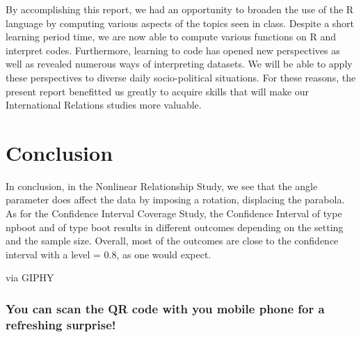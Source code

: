\documentclass[11pt,]{article}
\begin{document}
By accomplishing this report, we had an opportunity to broaden the use
of the R language by computing various aspects of the topics seen in
class. Despite a short learning period time, we are now able to compute
various functions on R and interpret codes. Furthermore, learning to
code has opened new perspectives as well as revealed numerous ways of
interpreting datasets. We will be able to apply these perspectives to
diverse daily socio-political situations. For these reasons, the present
report benefitted us greatly to acquire skills that will make our
International Relations studies more valuable.

\hypertarget{conclusion}{%
\section{Conclusion}\label{conclusion}}

In conclusion, in the Nonlinear Relationship Study, we see that the
angle parameter does affect the data by imposing a rotation, displacing
the parabola. As for the Confidence Interval Coverage Study, the
Confidence Interval of type npboot and of type boot results in different
outcomes depending on the setting and the sample size. Overall, most of
the outcomes are close to the confidence interval with a level = 0.8, as
one would expect.

via GIPHY

\hypertarget{you-can-scan-the-qr-code-with-you-mobile-phone-for-a-refreshing-surprise}{%
\subsubsection{You can scan the QR code with you mobile phone for a
refreshing
surprise!}\label{you-can-scan-the-qr-code-with-you-mobile-phone-for-a-refreshing-surprise}}
\end{document}
